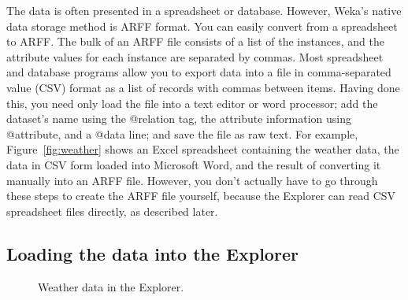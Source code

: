 The data is often presented in a spreadsheet or database. However,
Weka's native data storage method is ARFF format. You can easily
convert from a spreadsheet to ARFF. The bulk of an ARFF file consists
of a list of the instances, and the attribute values for each instance
are separated by commas. Most spreadsheet and database programs allow
you to export data into a file in comma-separated value (CSV) format
as a list of records with commas between items. Having done this, you
need only load the file into a text editor or word processor; add the
dataset’s name using the @relation tag, the attribute information
using @attribute, and a @data line; and save the file as raw text. For
example, Figure~\ref{fig:weather} shows an Excel spreadsheet
containing the weather data, the data in CSV form loaded into
Microsoft Word, and the result of converting it manually into an ARFF
file. However, you don’t actually have to go through these steps to
create the ARFF file yourself, because the Explorer can read CSV
spreadsheet files directly, as described later.

\subsection{Loading the data into the Explorer}

\begin{figure}[!th]
\centering
{}
\qquad
{}
\caption{\label{fig:weather_explorer}Weather data in the Explorer.}
\end{figure}

